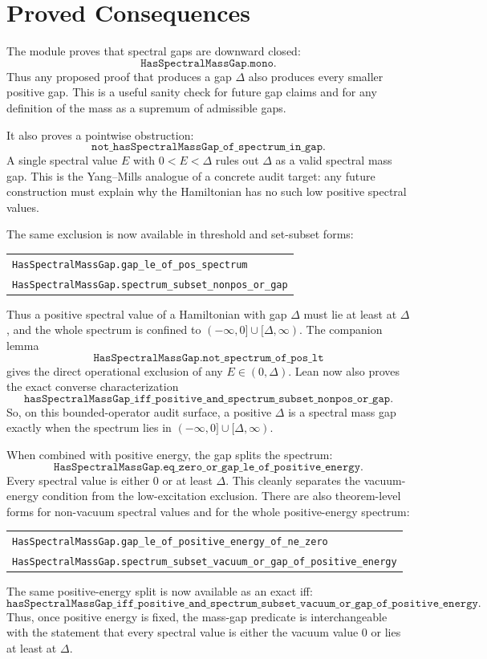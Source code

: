 \documentclass[11pt]{article}
\newcommand{\lean}[1]{\texttt{#1}}
\newcommand{\leansmall}[1]{{\small\texttt{#1}}}
\begin{document}
\section{Proved Consequences}

The module proves that spectral gaps are downward closed:
\[
  \lean{HasSpectralMassGap.mono}.
\]
Thus any proposed proof that produces a gap \(\Delta\) also produces every
smaller positive gap.  This is a useful sanity check for future gap claims and
for any definition of the mass as a supremum of admissible gaps.

It also proves a pointwise obstruction:
\[
  \lean{not\_hasSpectralMassGap\_of\_spectrum\_in\_gap}.
\]
A single spectral value \(E\) with \(0<E<\Delta\) rules out \(\Delta\) as a
valid spectral mass gap.  This is the Yang--Mills analogue of a concrete audit
target: any future construction must explain why the Hamiltonian has no such
low positive spectral values.

The same exclusion is now available in threshold and set-subset forms:
\begin{center}
\begin{tabular}{l}
\leansmall{HasSpectralMassGap.gap\_le\_of\_pos\_spectrum}\\
\leansmall{HasSpectralMassGap.spectrum\_subset\_nonpos\_or\_gap}
\end{tabular}
\end{center}
Thus a positive spectral value of a Hamiltonian with gap \(\Delta\) must lie at
least at \(\Delta\), and the whole spectrum is confined to
\((-\infty,0]\cup[\Delta,\infty)\).  The companion lemma
\[
  \lean{HasSpectralMassGap.not\_spectrum\_of\_pos\_lt}
\]
gives the direct operational exclusion of any \(E\in(0,\Delta)\).
Lean now also proves the exact converse characterization
\[
  \lean{hasSpectralMassGap\_iff\_positive\_and\_spectrum\_subset\_nonpos\_or\_gap}.
\]
So, on this bounded-operator audit surface, a positive \(\Delta\) is a spectral
mass gap exactly when the spectrum lies in \((-\infty,0]\cup[\Delta,\infty)\).

When combined with positive energy, the gap splits the spectrum:
\[
  \lean{HasSpectralMassGap.eq\_zero\_or\_gap\_le\_of\_positive\_energy}.
\]
Every spectral value is either \(0\) or at least \(\Delta\).  This cleanly
separates the vacuum-energy condition from the low-excitation exclusion.
There are also theorem-level forms for non-vacuum spectral values and for the
whole positive-energy spectrum:
\begin{center}
\begin{tabular}{l}
\leansmall{HasSpectralMassGap.gap\_le\_of\_positive\_energy\_of\_ne\_zero}\\
\leansmall{HasSpectralMassGap.spectrum\_subset\_vacuum\_or\_gap\_of\_positive\_energy}
\end{tabular}
\end{center}
The same positive-energy split is now available as an exact iff:
\[
  \lean{hasSpectralMassGap\_iff\_positive\_and\_spectrum\_subset\_vacuum\_or\_gap\_of\_positive\_energy}.
\]
Thus, once positive energy is fixed, the mass-gap predicate is interchangeable
with the statement that every spectral value is either the vacuum value \(0\)
or lies at least at \(\Delta\).
\end{document}
